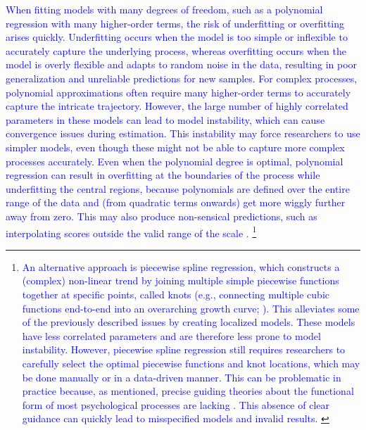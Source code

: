 \documentclass[man, floatsintext]{apa7}
\begin{document}
\textcolor{blue}{
  When fitting models with many degrees of freedom, such as a polynomial
  regression with many higher-order terms, the risk of underfitting or
  overfitting arises quickly. Underfitting occurs when the model is too simple
  or inflexible to accurately capture the underlying process, whereas
  overfitting occurs when the model is overly flexible and adapts to random
  noise in the data, resulting in poor generalization and unreliable
  predictions for new samples. For complex processes, polynomial approximations
  often require many higher-order terms to accurately capture the intricate
  trajectory. However, the large number of highly correlated parameters in
  these models can lead to model instability, which can cause convergence
  issues during estimation. This instability may force researchers to use
  simpler models, even though these might not be able to capture more complex
  processes accurately. Even when the polynomial degree is optimal, polynomial
  regression can result in overfitting at the boundaries of the process while
  underfitting the central regions, because polynomials are defined over the
  entire range of the data and (from quadratic terms onwards) get more wiggly
  further away from zero. This may also produce non-sensical predictions, such
  as interpolating scores outside the valid range of the scale
  \parencite{magee_nonlocal_1998, boyd_divergence_2009, harrell_general_2001,
    jianan_case_2023}.
}\footnote{\textcolor{blue}{
    An alternative approach is piecewise spline regression, which
    constructs a
    (complex) non-linear trend by joining multiple simple piecewise functions
    together at specific points, called knots (e.g., connecting multiple cubic
    functions end-to-end into an overarching growth curve;
    \textcite{tsay_nonlinear_2019}). \textcolor{blue}{This alleviates some of
      the
      previously described issues by creating localized models. These models
      have
      less correlated parameters and are therefore less prone to model
      instability.
      However, piecewise spline regression still requires researchers to
      carefully
      select the optimal piecewise functions and knot locations, which may be
      done
      manually or in a data-driven manner}. This can be problematic in practice
    because, as mentioned, precise guiding theories about the functional form
    of
    most psychological processes are lacking \parencite{tan_time-varying_2011}.
    This absence of clear guidance can quickly lead to misspecified models and
    invalid results.
  }
}
\end{document}
